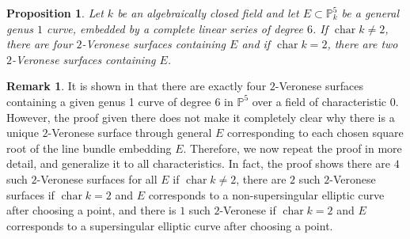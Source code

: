 \documentclass[reqno, 11pt]{amsart}
\theoremstyle{definition}
\theoremstyle{remark}
\numberwithin{equation}{section}
\numberwithin{thm}{section}
\numberwithin{prop}{section}
\numberwithin{lem}{section}
\numberwithin{cor}{section}
\numberwithin{conj}{section}
\numberwithin{defn}{section}
\DeclareMathOperator\ch{char}
\theoremstyle{plain}
\newtheorem{proposition}[theorem]{Proposition}
\theoremstyle{definition}
\newtheorem{remark}[theorem]{Remark}
\newcommand\bp{{\mathbb P}}
\begin{document}
\begin{proposition}
  \label{proposition:veronese-surfaces-through-genus-1-curves}
  Let $k$ be an algebraically closed field and let $E \subset \bp^5_k$
  be a general genus $1$ curve, embedded by a complete linear series of degree
  $6$.
  If $\ch k \neq 2$, there are four $2$-Veronese surfaces
  containing $E$ and if $\ch k = 2$, there are two $2$-Veronese
  surfaces containing $E$.
\end{proposition}
\begin{remark}
  \label{remark:}
  It is shown in
     \cite[Theorem 5.6]{dolgachev:on-certain-families-of-elliptic-curves-in-projective-space} that there are exactly four $2$-Veronese surfaces containing
  a given genus 1 curve of degree $6$ in $\bp^5$
over a field of characteristic $0$.
  However, the proof given there does not make it completely clear
  why there is a unique $2$-Veronese surface through general $E$
  corresponding to each chosen square root of the line bundle embedding
  $E$. Therefore, we now repeat the proof in more detail,
  and generalize it to all characteristics.
  In fact, the proof shows there are $4$ such $2$-Veronese surfaces
  for all $E$ if $\ch k \neq 2$, there are $2$ such $2$-Veronese surfaces
  if $\ch k = 2$ and $E$ corresponds to a non-supersingular elliptic curve after choosing a point,
  and there is $1$ such $2$-Veronese if $\ch k = 2$ and $E$ corresponds to a supersingular elliptic
  curve after choosing a point.
\end{remark}
\end{document}
